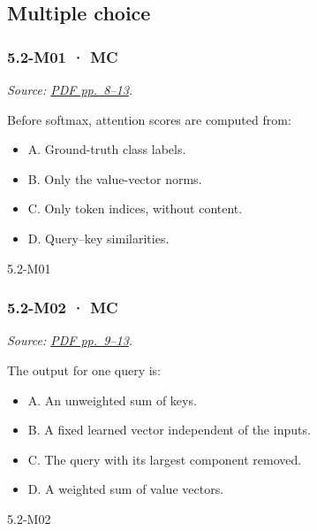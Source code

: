 \subsection{Multiple choice}\label{multiple-choice-14}

\noindent\begin{minipage}{\linewidth}

\subsubsection{5.2-M01 · MC}\label{m01-mc-13}

\emph{Source:
\href{../Lecture\%20Slides/5.2.\%20Transformers.pdf\#page=8}{PDF
pp.~8--13}.}

Before softmax, attention scores are computed from:

\begin{itemize}
\tightlist
\item
  A. Ground-truth class labels.
\item
  B. Only the value-vector norms.
\item
  C. Only token indices, without content.
\item
  D. Query--key similarities.
\end{itemize}

\begin{solution}[8mm]{5.2-M01}

\end{solution}
\end{minipage}\par\medskip

\noindent\begin{minipage}{\linewidth}

\subsubsection{5.2-M02 · MC}\label{m02-mc-13}

\emph{Source:
\href{../Lecture\%20Slides/5.2.\%20Transformers.pdf\#page=9}{PDF
pp.~9--13}.}

The output for one query is:

\begin{itemize}
\tightlist
\item
  A. An unweighted sum of keys.
\item
  B. A fixed learned vector independent of the inputs.
\item
  C. The query with its largest component removed.
\item
  D. A weighted sum of value vectors.
\end{itemize}

\begin{solution}[8mm]{5.2-M02}

\end{solution}
\end{minipage}\par\medskip

